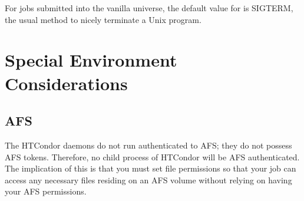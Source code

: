 For jobs submitted into the vanilla universe, the default value for
 is SIGTERM,
the usual method to nicely terminate a Unix program.











%


\section{Special Environment Considerations}

\subsection{AFS}

The HTCondor daemons do not run authenticated to AFS; they do not possess
AFS tokens.
Therefore, no child process of HTCondor will be AFS authenticated.
The implication of this is that you must set file permissions so
that your job can access any necessary files residing on an AFS volume
without relying on having your AFS permissions.

